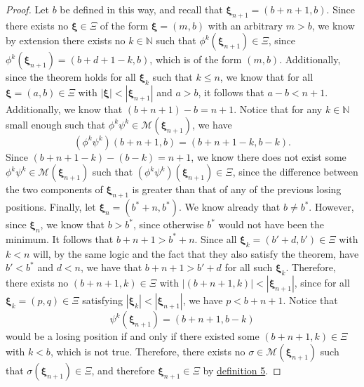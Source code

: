 \documentclass[11pt, letterpaper]{article}
\begin{document}
\begin{proof}
Let $b$ be defined in this way, and recall that $\boldsymbol{\xi}_{n+1}=(b+n+1,b)$. Since there exists no $\boldsymbol{\xi} \in \Xi $ of the form $\boldsymbol{\xi}  =(m,b)$ with an arbitrary $m>b$, we know by extension there exists no $k\in\mathbb{N}$ such that $\phi ^k\left( \boldsymbol{\xi} _{n+1} \right) \in \Xi $, since $\phi ^k\left( \boldsymbol{\xi} _{n+1} \right) =(b+d+1-k,b)$, which is of the form $(m,b)$. Additionally, since the theorem holds for all $\boldsymbol{\xi} _k$ such that $k\leq n$, we know that for all $\boldsymbol{\xi}=(a,b)\in \Xi  $ with $\left| \boldsymbol{\xi}  \right| <\left| \boldsymbol{\xi} _{n+1} \right| $ and $a>b$, it follows that $a-b<n+1$. Additionally, we know that $(b+n+1)-b=n+1$. Notice that for any $k\in\mathbb{N}$ small enough such that $\phi ^k\psi ^k\in \mathscr{M} \left( \boldsymbol{\xi} _{n+1} \right) $, we have
\[
	\left( \phi ^k\psi ^k \right) (b+n+1,b)=(b+n+1-k,b-k)
.\]
Since $(b+n+1-k)-(b-k)=n+1$, we know there does not exist some $\phi ^k\psi ^k\in \mathscr{M} \left( \boldsymbol{\xi} _{n+1} \right) $ such that $\left( \phi  ^k\psi ^k \right) \left( \boldsymbol{\xi} _{n+1} \right) \in \Xi $, since the difference between the two components of $\boldsymbol{\xi} _{n+1}$ is greater than that of any of the previous losing positions. Finally, let $\boldsymbol{\xi}_n = \left( b^*+n,b^* \right) $. We know already that $b\neq b^*$. However, since $\boldsymbol{\xi} _n$, we know that $b>b^*$, since otherwise $b^*$ would not have been the minimum. It follows that $b+n+1>b^*+n$. Since all $\boldsymbol{\xi} _{k}=(b'+d,b')\in \Xi $ with $k<n$ will, by the same logic and the fact that they also satisfy the theorem, have $b'<b^*$ and $d<n$, we have that $b+n+1>b'+d$ for all such $\boldsymbol{\xi} _k$. Therefore, there exists no $\left( b+n+1,k \right) \in \Xi $ with $\left| \left( b+n+1,k \right)  \right| <\left| \boldsymbol{\xi} _{n+1} \right| $, since for all $\boldsymbol{\xi}_k=(p,q)\in \Xi $ satisfying $\left| \boldsymbol{\xi} _k \right| <\left| \boldsymbol{\xi} _{n+1} \right| $, we have $p<b+n+1$. Notice that
\[
	\psi ^k\left( \boldsymbol{\xi} _{n+1} \right) =\left( b+n+1,b-k \right) 
\]
would be a losing position if and only if there existed some $(b+n+1,k)\in \Xi $ with $k<b$, which is not true. Therefore, there exists no $\sigma \in \mathscr{M} \left( \boldsymbol{\xi} _{n+1} \right) $ such that $\sigma \left( \boldsymbol{\xi} _{n+1} \right) \in \Xi $, and therefore $\boldsymbol{\xi}  _{n+1}\in \Xi $ by \hyperref[dfn:5]{definition 5}.


\end{proof}
\end{document}
